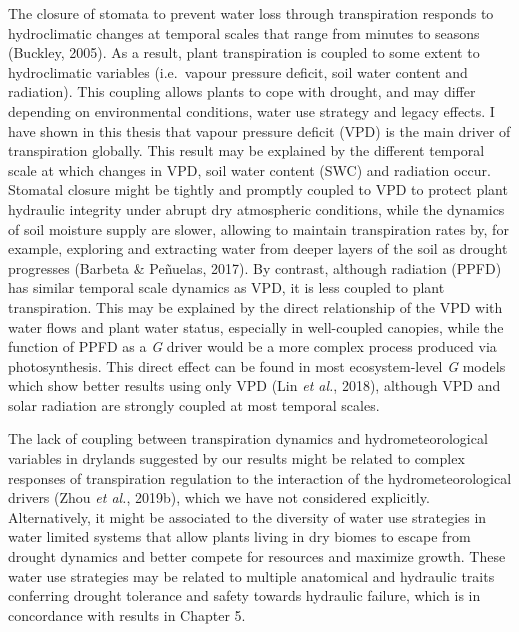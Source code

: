 \documentclass[11pt,twoside]{reedthesis}
\begin{document}
The closure of stomata to prevent water loss through transpiration
responds to hydroclimatic changes at temporal scales that range from
minutes to seasons (Buckley, 2005). As a result, plant transpiration is
coupled to some extent to hydroclimatic variables (i.e.~vapour pressure
deficit, soil water content and radiation). This coupling allows plants
to cope with drought, and may differ depending on environmental
conditions, water use strategy and legacy effects. I have shown in this
thesis that vapour pressure deficit (VPD) is the main driver of
transpiration globally. This result may be explained by the different
temporal scale at which changes in VPD, soil water content (SWC) and
radiation occur. Stomatal closure might be tightly and promptly coupled
to VPD to protect plant hydraulic integrity under abrupt dry atmospheric
conditions, while the dynamics of soil moisture supply are slower,
allowing to maintain transpiration rates by, for example, exploring and
extracting water from deeper layers of the soil as drought progresses
(Barbeta \& Peñuelas, 2017). By contrast, although radiation (PPFD) has
similar temporal scale dynamics as VPD, it is less coupled to plant
transpiration. This may be explained by the direct relationship of the
VPD with water flows and plant water status, especially in well-coupled
canopies, while the function of PPFD as a \emph{G} driver would be a
more complex process produced via photosynthesis. This direct effect can
be found in most ecosystem-level \emph{G} models which show better
results using only VPD (Lin \emph{et al.}, 2018), although VPD and solar
radiation are strongly coupled at most temporal scales.\par

The lack of coupling between transpiration dynamics and
hydrometeorological variables in drylands suggested by our results might
be related to complex responses of transpiration regulation to the
interaction of the hydrometeorological drivers (Zhou \emph{et al.},
2019b), which we have not considered explicitly. Alternatively, it might
be associated to the diversity of water use strategies in water limited
systems that allow plants living in dry biomes to escape from drought
dynamics and better compete for resources and maximize growth. These
water use strategies may be related to multiple anatomical and hydraulic
traits conferring drought tolerance and safety towards hydraulic
failure, which is in concordance with results in Chapter 5.\par
\end{document}

